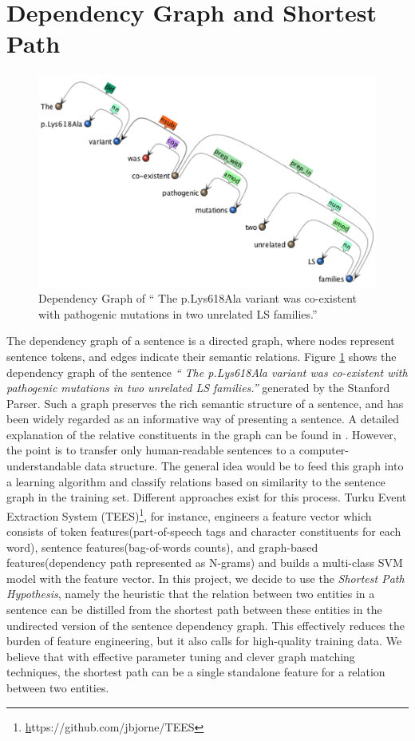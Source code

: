 \section{Dependency Graph and Shortest Path}
	\begin{figure}
		\centering
			\includegraphics[width=\textwidth]{Dependency_Graph}
			\caption{Dependency Graph of `` The p.Lys618Ala variant was co-existent with pathogenic mutations in two unrelated LS families.''}
			\label{fig:Dependency_Graph}   
	\end{figure}
The dependency graph of a sentence is a directed graph, where nodes represent sentence tokens, and edges indicate their semantic relations. Figure \ref{fig:Dependency_Graph} shows the dependency graph of the sentence \emph{`` The p.Lys618Ala variant was co-existent with pathogenic mutations in two unrelated LS families.''} generated by the Stanford Parser. Such a graph preserves the rich semantic structure of a sentence, and has been widely regarded as an informative way of presenting a sentence. A detailed explanation of the relative constituents in the graph can be found in \cite{de2008stanford}. However, the point is to transfer only human-readable sentences to a computer-understandable data structure. The general idea would be to feed this graph into a learning algorithm and classify relations based on similarity to the sentence graph in the training set. Different approaches exist for this process. Turku Event Extraction System (TEES)\footnote{\href{https://github.com/jbjorne/TEES}https://github.com/jbjorne/TEES}, for instance, engineers a feature vector which consists of token features(part-of-speech tags and character constituents for each word), sentence features(bag-of-words counts), and graph-based features(dependency path represented as N-grams) and builds a multi-class SVM model with the feature vector\cite{bjorne2011generalizing}. In this project, we decide to use the \emph{Shortest Path Hypothesis}\cite{bunescu2005shortest}, namely the heuristic that the relation between two entities in a sentence can be distilled from the shortest path between these entities in the undirected version of the sentence dependency graph. This effectively reduces the burden of feature engineering\cite{liu2013approximate}, but it also calls for high-quality training data. We believe that with effective parameter tuning and clever graph matching techniques, the shortest path can be a single standalone feature for a relation between two entities.
